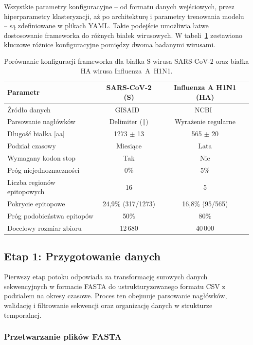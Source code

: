 Wszystkie parametry konfiguracyjne -- od formatu danych wejściowych, przez hiperparametry klasteryzacji, aż po architekturę i parametry trenowania modelu -- są zdefiniowane w plikach YAML. Takie podejście umożliwia łatwe dostosowanie frameworka do różnych białek wirusowych. W tabeli~\ref{tab:config-comparison} zestawiono kluczowe różnice konfiguracyjne pomiędzy dwoma badanymi wirusami.

\begin{table}[H]
\centering
\caption{Porównanie konfiguracji frameworka dla białka S wirusa SARS-CoV-2 oraz białka HA wirusa Influenza~A~H1N1.}
\label{tab:config-comparison}
\small
\begin{tabular}{lcc}
\toprule
\textbf{Parametr} & \textbf{SARS-CoV-2 (S)} & \textbf{Influenza A H1N1 (HA)} \\
\midrule
Źródło danych & GISAID~\cite{elbe2017gisaid} & NCBI~\cite{bao2008ncbi} \\
Parsowanie nagłówków & Delimiter (\texttt{|}) & Wyrażenie regularne \\
Długość białka [aa] & 1273 $\pm$ 13 & 565 $\pm$ 20 \\
Podział czasowy & Miesiące & Lata \\
Wymagany kodon stop & Tak & Nie \\
Próg niejednoznaczności & 0\% & 5\% \\
Liczba regionów epitopowych & 16 & 5 \\
Pokrycie epitopowe & 24{,}9\% (317/1273) & 16{,}8\% (95/565) \\
Próg podobieństwa epitopów & 50\% & 80\% \\
Docelowy rozmiar zbioru & 12\,680 & 40\,000 \\
\bottomrule
\end{tabular}
\end{table}

\subsection{Etap 1: Przygotowanie danych}
\label{subsec:przygotowanie-danych}

Pierwszy etap potoku odpowiada za transformację surowych danych sekwencyjnych w formacie FASTA do ustrukturyzowanego formatu CSV z podziałem na okresy czasowe. Proces ten obejmuje parsowanie nagłówków, walidację i filtrowanie sekwencji oraz organizację danych w strukturze temporalnej.

\subsubsection{Przetwarzanie plików FASTA}
\label{subsubsec:fasta}


